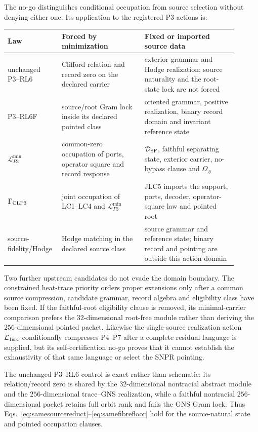 \documentclass[11pt,a4paper]{article}
\theoremstyle{remark}
\begin{document}
The no-go distinguishes conditional occupation from source selection without
denying either one.  Its application to the registered P3 actions is:
\begin{center}
\small
\begin{tabular}{p{0.18\linewidth}p{0.34\linewidth}p{0.38\linewidth}}
\toprule
Law & Forced by minimization & Fixed or imported source data\\
\midrule
unchanged P3--RL6 & Clifford relation and record zero on the declared carrier
& exterior grammar and Hodge realization; source naturality and the root-state
lock are not forced\\
P3--RL6F & source/root Gram lock inside its declared pointed class
& oriented grammar, positive realization, binary record domain and invariant
reference state\\
$\mathcal L_{P3}^{\min}$ & common-zero occupation of ports, operator square
and record response & $\mathcal D_{\rm SF}$, faithful separating state,
exterior carrier, no-bypass clause and $\Omega_\varnothing$\\
$\Gamma_{\rm CLP3}$ & joint occupation of LC1--LC4 and
$\mathcal L_{P3}^{\min}$ & JLC5 imports the support, ports, decoder,
operator-square law and pointed root\\
source-fidelity/Hodge & Hodge matching in the declared source class
& source grammar and reference state; binary record and pointing are outside
this action domain\\
\bottomrule
\end{tabular}
\end{center}

Two further upstream candidates do not evade the domain boundary.  The
constrained heat-trace priority orders proper extensions only after a common
source compression, candidate grammar, record algebra and eligibility class
have been fixed.  If the faithful-root eligibility clause is removed, its
minimal-carrier comparison prefers the $32$-dimensional root-free module
rather than deriving the $256$-dimensional pointed packet.  Likewise the
single-source realization action $\mathcal L_{\rm 1src}$ conditionally
compresses P4--P7 after a complete residual language is supplied, but its
self-certification no-go proves that it cannot establish the exhaustivity of
that same language or select the SNPR pointing.

The unchanged P3--RL6 control is exact rather than schematic: its
relation/record zero is shared by the $32$-dimensional nontracial abstract
module and the $256$-dimensional trace--GNS realization, while a faithful
nontracial $256$-dimensional packet retains full orbit rank and fails the GNS
Gram lock.  Thus Eqs.~\eqref{eq:samesourcereduct}--\eqref{eq:samefibrefloor}
hold for the source-natural state and pointed occupation clauses.
\end{document}

